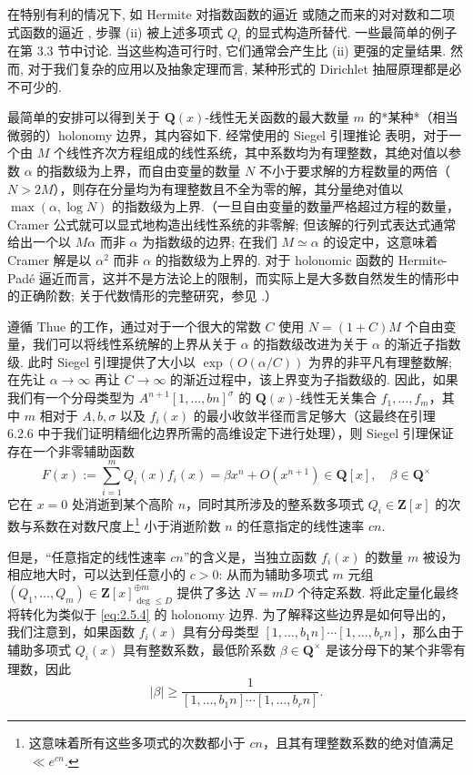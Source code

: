 在特别有利的情况下, 如 Hermite 对指数函数的逼近 \cite{Her1874, Her1893} 或随之而来的对对数和二项式函数的逼近 \cite{Chu79, Chu83b}, 步骤 (ii) 被上述多项式 \(Q_i\) 的显式构造所替代. 一些最简单的例子在第 3.3 节中讨论. 当这些构造可行时, 它们通常会产生比 (ii) 更强的定量结果. 然而, 对于我们复杂的应用以及抽象定理而言, 某种形式的 Dirichlet 抽屉原理都是必不可少的.

最简单的安排可以得到关于 $\mathbf{Q}(x)$-线性无关函数的最大数量 $m$ 的*某种*（相当微弱的）holonomy 边界，其内容如下. 经常使用的 Siegel 引理推论 \cite[Lemma 2.9.1]{BG06} 表明，对于一个由 $M$ 个线性齐次方程组成的线性系统，其中系数均为有理整数，其绝对值以参数 $\alpha$ 的指数级为上界，而自由变量的数量 $N$ 不小于要求解的方程数量的两倍（$N > 2M$），则存在分量均为有理整数且不全为零的解，其分量绝对值以 $\max(\alpha, \log N)$ 的指数级为上界.（一旦自由变量的数量严格超过方程的数量，Cramer 公式就可以显式地构造出线性系统的非零解; 但该解的行列式表达式通常给出一个以 $M\alpha$ 而非 $\alpha$ 为指数级的边界; 在我们 $M \simeq \alpha$ 的设定中，这意味着 Cramer 解是以 $\alpha^2$ 而非 $\alpha$ 的指数级为上界的. 对于 holonomic 函数的 Hermite-Padé 逼近而言，这并不是方法论上的限制，而实际上是大多数自然发生的情形中的正确阶数; 关于代数情形的完整研究，参见 \cite{BC97b}.）

遵循 Thue \cite[§ 11]{Thu77} 的工作，通过对于一个很大的常数 $C$ 使用 $N = (1+C)M$ 个自由变量，我们可以将线性系统解的上界从关于 $\alpha$ 的指数级改进为关于 $\alpha$ 的渐近子指数级. 此时 Siegel 引理提供了大小以 $\exp\left(O\left(\alpha/C\right)\right)$ 为界的非平凡有理整数解; 在先让 $\alpha\to\infty$ 再让 $C\to\infty$ 的渐近过程中，该上界变为子指数级的. 因此，如果我们有一个分母类型为 $A^{n+1}[1,\ldots,bn]^{\sigma}$ 的 $\mathbf{Q}(x)$-线性无关集合 $f_1,\ldots,f_m$，其中 $m$ 相对于 $A,b,\sigma$ 以及 $f_i(x)$ 的最小收敛半径而言足够大（这最终在引理 6.2.6 中于我们证明精细化边界所需的高维设定下进行处理），则 Siegel 引理保证存在一个非零辅助函数
\begin{equation}\label{eq:2.12.0}
F(x) := \sum_{i=1}^{m} Q_i(x) f_i(x) = \beta x^n + O(x^{n+1}) \in \mathbf{Q}[x], \quad \beta \in \mathbf{Q}^{\times}
\end{equation}
它在 $x = 0$ 处消逝到某个高阶 $n$，同时其所涉及的整系数多项式 $Q_i \in \mathbf{Z}[x]$ 的次数与系数在对数尺度上\footnote{这意味着所有这些多项式的次数都小于 $cn$，且其有理整数系数的绝对值满足 $\ll e^{cn}$.} 小于消逝阶数 $n$ 的任意指定的线性速率 $cn$.

但是，“任意指定的线性速率 $cn$”的含义是，当独立函数 $f_i(x)$ 的数量 $m$ 被设为相应地大时，可以达到任意小的 $c > 0$: 从而为辅助多项式 $m$ 元组 $(Q_1, \dots, Q_m) \in \mathbf{Z}[x]_{\deg \leq D}^{\oplus m}$ 提供了多达 $N = mD$ 个待定系数. 将此定量化最终将转化为类似于 \eqref{eq:2.5.4} 的 holonomy 边界. 为了解释这些边界是如何导出的，我们注意到，如果函数 $f_i(x)$ 具有分母类型 $[1, \dots, b_1 n] \cdots [1, \dots, b_r n]$，那么由于辅助多项式 $Q_i(x)$ 具有整数系数，最低阶系数 $\beta \in \mathbf{Q}^{\times}$ 是该分母下的某个非零有理数，因此
\begin{equation}\label{eq:2.12.1}
|\beta| \ge \frac{1}{[1, \dots, b_1 n] \cdots [1, \dots, b_r n]}.
\end{equation}

